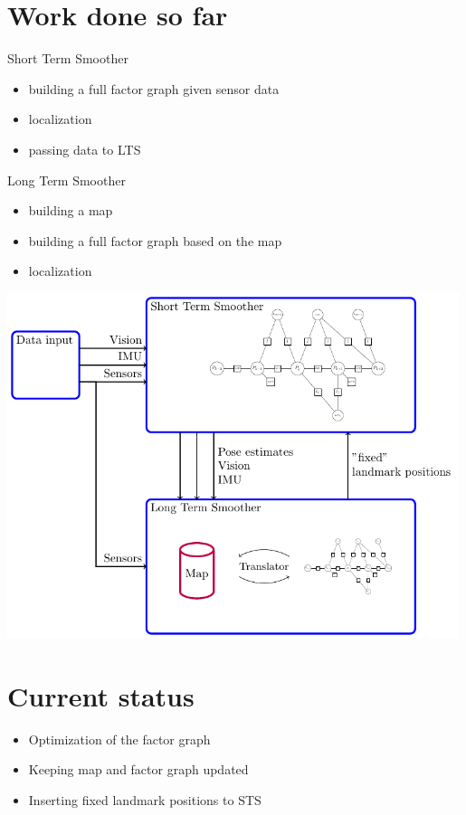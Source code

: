 \documentclass[%
    fourtothree=true, %
    DepLogo=true     %
    ]{ETHpres}
\begin{document}
\section*{Work done so far}
\begin{minipage}{0.4\textwidth}
\footnotesize
	 Short Term Smoother 
		\begin{itemize}
			\item[\ETHitem] building a full factor graph given sensor data
			\item[\ETHitem] localization 
			\item[\ETHitem] passing data to LTS
		\end{itemize}
		
\footnotesize		
	 Long Term Smoother
		\begin{itemize}
		 	\item[\ETHitem] building a map
		 	\item[\ETHitem] building a full factor graph based on the map
		 	\item[\ETHitem] localization
		\end{itemize}
\end{minipage}
\hspace{0.2cm}
\begin{minipage}{0.59\textwidth}
	\centering
	\includegraphics[width=0.99\textwidth]{TikZ_drawings/STS_and_LTS/STS_and_LTS.pdf}\\
\end{minipage}

		
		
\clearpage

\ETHslide
\section*{Current status}
\begin{itemize}
	\item[\ETHitem] Optimization of the factor graph
	\item[\ETHitem] Keeping map and factor graph updated
	\item[\ETHitem] Inserting fixed landmark positions to STS
\end{itemize}
\end{document}
